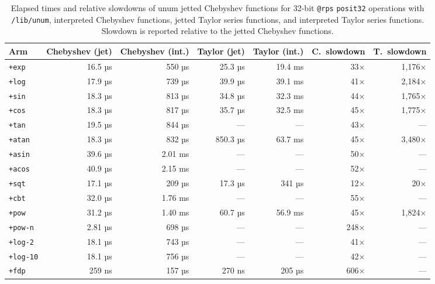 \documentclass[twoside]{article}
\begin{document}
\begin{table}
\centering
\caption{Elapsed times and relative slowdowns of unum jetted Chebyshev functions for 32-bit \texttt{@rps} \texttt{posit32} operations with \texttt{/lib/unum}, interpreted Chebyshev functions, jetted Taylor series functions, and interpreted Taylor series functions.  Slowdown is reported relative to the jetted Chebyshev functions.}
\label{tab:unum}
\begin{tabular}{lrrrrrr}
\toprule
Arm & Chebyshev (jet) & Chebyshev (int.) & Taylor (jet) & Taylor (int.) & C.\ slowdown & T.\ slowdown \\
\midrule
\texttt{+exp} & 16.5 µs & 550 µs & 25.3 µs & 19.4 ms & 33× & 1,176× \\
\texttt{+log} & 17.9 µs & 739 µs & 39.9 µs & 39.1 ms & 41× & 2,184× \\
\texttt{+sin} & 18.3 µs & 813 µs & 34.8 µs & 32.3 ms & 44× & 1,765× \\
\texttt{+cos} & 18.3 µs & 817 µs & 35.7 µs & 32.5 ms & 45× & 1,775× \\
\texttt{+tan} & 19.5 µs & 844 µs & --- & --- & 43× & --- \\
\texttt{+atan} & 18.3 µs & 832 µs & 850.3 µs & 63.7 ms & 45× & 3,480× \\
\texttt{+asin} & 39.6 µs & 2.01 ms & --- & --- & 50× & --- \\
\texttt{+acos} & 40.9 µs & 2.15 ms  & --- & --- & 52× & --- \\
\texttt{+sqt} & 17.1 µs & 209 µs & 17.3 µs & 341 µs & 12× & 20× \\
\texttt{+cbt} & 32.0 µs & 1.76 ms  & --- & --- & 55× & --- \\
\texttt{+pow} & 31.2 µs & 1.40 ms & 60.7 µs & 56.9 ms & 45× & 1,824× \\
\texttt{+pow-n} & 2.81 µs & 698 µs  & --- & --- & 248× & --- \\
\texttt{+log-2} & 18.1 µs & 743 µs & --- & --- & 41× & ---\\
\texttt{+log-10} & 18.1 µs & 756 µs & --- & --- & 42× & --- \\
\texttt{+fdp} & 259 ns & 157 µs & 270 ns & 205 µs & 606× & --- \\
\bottomrule
\end{tabular}
\end{table}
\end{document}
